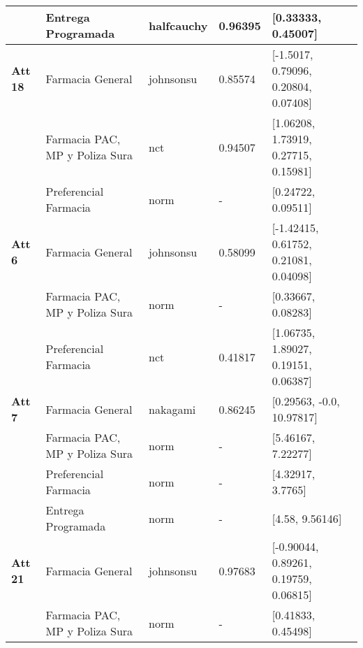 \begin{longtable}[c]{lp{3cm}llp{5cm}}
       & Entrega Programada                       & halfcauchy   & 0.96395 & {[}0.33333, 0.45007{]}                                                                   \\ \hline
\textbf{Att 18} & Farmacia General                         & johnsonsu    & 0.85574 & {[}-1.5017, 0.79096, 0.20804, 0.07408{]}                                                 \\
       & Farmacia PAC, MP y Poliza Sura           & nct          & 0.94507 & {[}1.06208, 1.73919, 0.27715, 0.15981{]}                                                 \\
       & Preferencial Farmacia                    & norm         & -       & {[}0.24722, 0.09511{]}                                                                   \\ \hline
\textbf{Att 6}  & Farmacia General                         & johnsonsu    & 0.58099 & {[}-1.42415, 0.61752, 0.21081, 0.04098{]}                                                \\
       & Farmacia PAC, MP y Poliza Sura           & norm         & -       & {[}0.33667, 0.08283{]}                                                                   \\
       & Preferencial Farmacia                    & nct          & 0.41817 & {[}1.06735, 1.89027, 0.19151, 0.06387{]}                                                 \\ \hline
\textbf{Att 7}  & Farmacia General                         & nakagami     & 0.86245 & {[}0.29563, -0.0, 10.97817{]}                                                            \\
       & Farmacia PAC, MP y Poliza Sura           & norm         & -       & {[}5.46167, 7.22277{]}                                                                   \\
       & Preferencial Farmacia                    & norm         & -       & {[}4.32917, 3.7765{]}                                                                    \\
       & Entrega Programada                       & norm         & -       & {[}4.58, 9.56146{]}                                                                      \\ \hline
\textbf{Att 21} & Farmacia General                         & johnsonsu    & 0.97683 & {[}-0.90044, 0.89261, 0.19759, 0.06815{]}                                                \\
       & Farmacia PAC, MP y Poliza Sura           & norm         & -       & {[}0.41833, 0.45498{]}                                                                   \\

\end{longtable}
